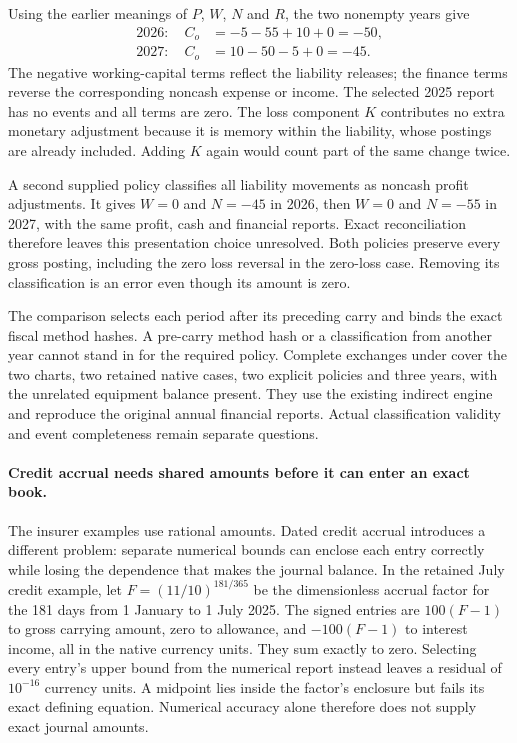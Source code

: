 Using the earlier meanings of $P$, $W$, $N$ and $R$, the two nonempty years give
\[
\begin{aligned}
  2026:\quad C_o&=-5-55+10+0=-50,\\
  2027:\quad C_o&=10-50-5+0=-45.
\end{aligned}
\]
The negative working-capital terms reflect the liability releases; the finance
terms reverse the corresponding noncash expense or income. The selected 2025
report has no events and all terms are zero. The loss component $K$ contributes
no extra monetary adjustment because it is memory within the liability,
whose postings are already included. Adding $K$ again would count part of the
same change twice.

A second supplied policy classifies all liability movements as noncash profit
adjustments. It gives $W=0$ and $N=-45$ in 2026, then $W=0$ and $N=-55$ in
2027, with the same profit, cash and financial reports. Exact reconciliation
therefore leaves this presentation choice unresolved. Both policies preserve
every gross posting, including the zero loss reversal in the zero-loss case.
Removing its classification is an error even though its amount is zero.

The comparison selects each period after its preceding carry and binds the
exact fiscal method hashes. A pre-carry method hash or a classification from
another year cannot stand in for the required policy. Complete exchanges under
 cover the
two charts, two retained native cases, two explicit policies and three years,
with the unrelated equipment balance present. They use the existing indirect
engine and reproduce the original annual financial reports. Actual
classification validity and event completeness remain separate questions.


\paragraph{Credit accrual needs shared amounts before it can enter an exact book.}
The insurer examples use rational amounts. Dated credit accrual introduces a
different problem: separate numerical bounds can enclose each entry correctly
while losing the dependence that makes the journal balance. In the retained
July credit example, let $F=(11/10)^{181/365}$ be the dimensionless accrual
factor for the 181 days from 1 January to 1 July 2025. The signed entries are
$100(F-1)$ to gross carrying amount, zero to allowance, and $-100(F-1)$ to
interest income, all in the native currency units. They sum exactly to zero.
Selecting every entry's upper bound from the numerical report instead leaves
a residual of $10^{-16}$ currency units. A midpoint lies inside the factor's
enclosure but fails its exact defining equation. Numerical accuracy alone
therefore does not supply exact journal amounts.

